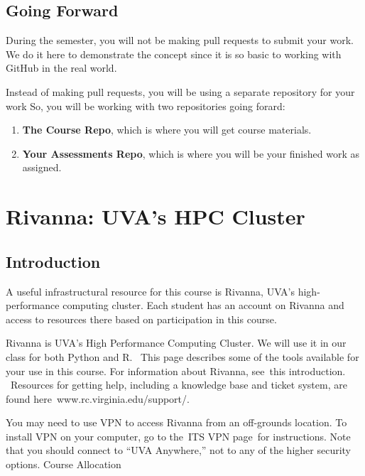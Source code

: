 \documentclass[
  letterpaper,
  DIV=11,
  numbers=noendperiod]{scrreport}
\providecommand{\tightlist}{%
  \setlength{\itemsep}{0pt}\setlength{\parskip}{0pt}}\usepackage{longtable,booktabs,array}
\begin{document}
\hypertarget{going-forward}{%
\section{Going Forward}\label{going-forward}}

During the semester, you will not be making pull requests to submit your
work. We do it here to demonstrate the concept since it is so basic to
working with GitHub in the real world.

Instead of making pull requests, you will be using a separate repository
for your work So, you will be working with two repositories going
forard:

\begin{enumerate}
\def\labelenumi{\arabic{enumi}.}
\tightlist
\item
  \textbf{The Course Repo}, which is where you will get course
  materials.
\item
  \textbf{Your Assessments Repo}, which is where you will be your
  finished work as assigned.
\end{enumerate}

\hypertarget{rivanna-uvas-hpc-cluster}{%
\chapter{Rivanna: UVA's HPC Cluster}\label{rivanna-uvas-hpc-cluster}}

\hypertarget{introduction}{%
\section{Introduction}\label{introduction}}

A useful infrastructural resource for this course is Rivanna, UVA's
high-performance computing cluster. Each student has an account on
Rivanna and access to resources there based on participation in this
course.

Rivanna is UVA's High Performance Computing Cluster. We will use it in
our class for both Python and R.~ This page describes some of the tools
available for your use in this course. For information about Rivanna,
see~this introduction. ~Resources for getting help, including a
knowledge base and ticket system, are found
here~www.rc.virginia.edu/support/.

You may need to use VPN to access Rivanna from an off-grounds location.
To install VPN on your computer, go to the~ITS VPN page~for
instructions. Note that you should connect to ``UVA Anywhere,'' not to
any of the higher security options. Course Allocation
\end{document}
